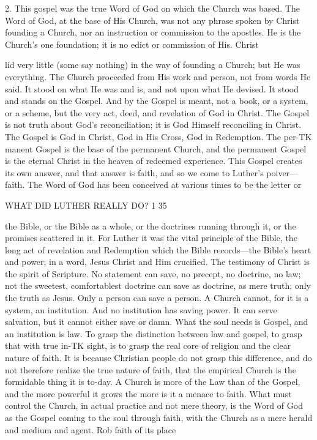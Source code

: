 \documentclass[12pt,a5paper,twoside]{book}
\begin{document}
2. This gospel was the true Word of God on 
which the Church was based. The Word of God, at 
the base of His Church, was not any phrase spoken 
by Christ founding a Church, nor an instruction or 
commission to the apostles. He is the Church's one 
foundation; it is no edict or commission of His. 
Christ {lid very little (some say nothing) in the way 
of founding a Church; but He was everything. The 
Church proceeded from His work and person, not from 
words He said. It stood on what He was and is, and 
not upon what He devised. It stood and stands on 
the Gospel. And by the Gospel is meant, not a book, 
or a system, or a scheme, but the very act, deed, and 
revelation of God in Christ. The Gospel is not 
truth about God's reconciliation; it is God Himself 
reconciling in Christ. The Gospel is God in Christ, 
God in His Cross, God in Redemption. The per-TK
manent Gospel is the base of the permanent Church, 
and the permanent Gospel is the eternal Christ in the 
heaven of redeemed experience. This Gospel creates 
its own answer, and that answer is faith, and so we 
come to Luther's poiver---faith. The Word of God 
has been conceived at various times to be the letter or 



WHAT DID LUTHER REALLY DO? 1 35 

the Bible, or the Bible as a whole, or the doctrines 
running through it, or the promises scattered in it. 
For Luther it was the vital principle of the Bible, the 
long act of revelation and Redemption which the Bible 
records---the Bible's heart and power; in a word, 
Jesus Christ and Him crucified. The testimony of 
Christ is the spirit of Scripture. No statement can 
save, no precept, no doctrine, no law; not the 
sweetest, comfortablest doctrine can save as doctrine, 
as mere truth; only the truth as Jesus. Only a 
person can save a person. A Church cannot, for it is 
a system, an institution. And no institution has 
saving power. It can serve salvation, but it cannot 
either save or damn. What the soul needs is Gospel, 
and an institution is law. To grasp the distinction 
between law and gospel, to grasp that with true in-TK
sight, is to grasp the real core of religion and the clear 
nature of faith. It is because Christian people do not 
grasp this difference, and do not therefore realize the 
true nature of faith, that the empirical Church is the 
formidable thing it is to-day. A Church is more of 
the Law than of the Gospel, and the more powerful it 
grows the more is it a menace to faith. What must 
control the Church, in actual practice and not mere 
theory, is the Word of God as the Gospel coming to 
the soul through faith, with the Church as a mere 
herald and medium and agent. Rob faith of its place 



}
\end{document}
